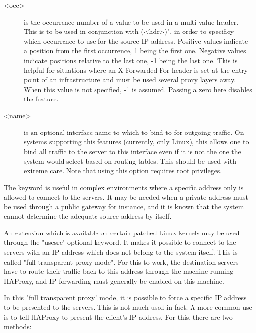 \begin{description}
  \item[<occ>] is the occurrence number of a value to be used in a multi-value
              header. This is to be used in conjunction with (<hdr>)",
              in order to specificy which occurrence to use for the source IP
              address. Positive values indicate a position from the first
              occurrence, 1 being the first one. Negative values indicate
              positions relative to the last one, -1 being the last one. This
              is helpful for situations where an X-Forwarded-For header is set
              at the entry point of an infrastructure and must be used several
              proxy layers away. When this value is not specified, -1 is
              assumed. Passing a zero here disables the feature.

  \item[<name>] is an optional interface name to which to bind to for outgoing
              traffic. On systems supporting this features (currently, only
              Linux), this allows one to bind all traffic to the server to
              this interface even if it is not the one the system would select
              based on routing tables. This should be used with extreme care.
              Note that using this option requires root privileges.
  \end{description}

  The  keyword is useful in complex environments where a specific
  address only is allowed to connect to the servers. It may be needed when a
  private address must be used through a public gateway for instance, and it is
  known that the system cannot determine the adequate source address by itself.

  An extension which is available on certain patched Linux kernels may be used
  through the "usesrc" optional keyword. It makes it possible to connect to the
  servers with an IP address which does not belong to the system itself. This
  is called "full transparent proxy mode". For this to work, the destination
  servers have to route their traffic back to this address through the machine
  running HAProxy, and IP forwarding must generally be enabled on this machine.

  In this "full transparent proxy" mode, it is possible to force a specific IP
  address to be presented to the servers. This is not much used in fact. A more
  common use is to tell HAProxy to present the client's IP address. For this,
  there are two methods:

